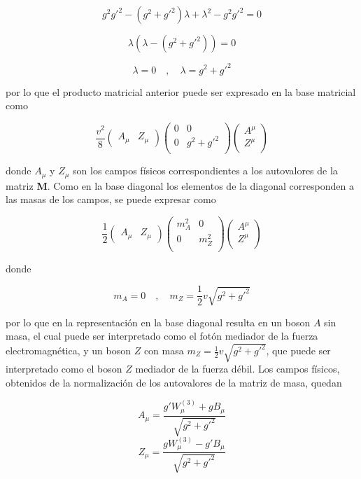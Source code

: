 $$ g^2g'^2 -(g^2+g'^2)\lambda + \lambda^2  - g^2g'^2 = 0  $$

$$ \lambda(\lambda - (g^2+g'^2)) = 0 $$

$$ \lambda = 0 \quad , \quad \lambda = g^2+g'^2 $$

por lo que el producto matricial anterior puede ser expresado en la base matricial como

$$ \frac{v^2}{8}\begin{pmatrix}
    A_{\mu} & Z_{\mu}
\end{pmatrix}\begin{pmatrix}
    0 & 0 \\
    0 & g^2+g'^2\\
\end{pmatrix}\begin{pmatrix}
    A^{\mu} \\
    Z^{\mu}\\
\end{pmatrix} $$

donde $A_{\mu}$ y $Z_{\mu}$ son los campos físicos correspondientes a los autovalores de la matriz \textbf{M}. Como en la base diagonal los elementos de la diagonal corresponden a las masas de los campos, se puede expresar como 

$$ \frac{1}{2}\begin{pmatrix}
    A_{\mu} & Z_{\mu}
\end{pmatrix}\begin{pmatrix}
    m_A^2 & 0 \\
    0 & m_Z^2\\
\end{pmatrix}\begin{pmatrix}
    A^{\mu} \\
    Z^{\mu}\\
\end{pmatrix} $$

donde 

$$ m_A = 0 \quad , \quad m_Z = \frac{1}{2}v\sqrt{g^2+g'^2} $$

por lo que en la representación en la base diagonal resulta en un boson $A$ sin masa, el cual puede ser interpretado como el fotón mediador de la fuerza electromagnética, y un boson $Z$ con masa $m_Z = \frac{1}{2}v\sqrt{g^2+g'^2}$, que puede ser interpretado como el boson $Z$ mediador de la fuerza débil. Los campos físicos, obtenidos de la normalización de los autovalores de la matriz de masa, quedan

$$ A_{\mu} = \frac{g'W_{\mu}^{(3)} + gB_{\mu}}{\sqrt{g^2+g'^2}} $$
$$ Z_{\mu} = \frac{gW_{\mu}^{(3)} - g'B_{\mu}}{\sqrt{g^2+g'^2}} $$

